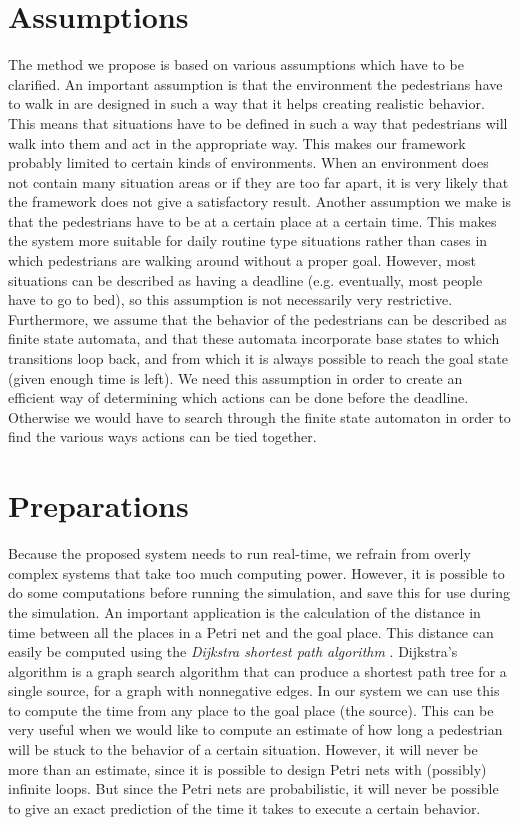 \documentclass[11pt]{book}
\begin{document}
\section{Assumptions}
The method we propose is based on various assumptions which have to be clarified. An important assumption is that the environment the pedestrians have to walk in are designed in such a way that it helps creating realistic behavior. This means that situations have to be defined in such a way that pedestrians will walk into them and act in the appropriate way. This makes our framework probably limited to certain kinds of environments. When an environment does not contain many situation areas or if they are too far apart, it is very likely that the framework does not give a satisfactory result.
Another assumption we make is that the pedestrians have to be at a certain place at a certain time. This makes the system more suitable for daily routine type situations rather than cases in which pedestrians are walking around without a proper goal. However, most situations can be described as having a deadline (e.g. eventually, most people have to go to bed), so this assumption is not necessarily very restrictive.\\
Furthermore, we assume that the behavior of the pedestrians can be described as finite state automata,  and that these automata incorporate base states to which transitions loop back, and from which it is always possible to reach the goal state (given enough time is left). We need this assumption in order to create an efficient way of determining which actions can be done before the deadline. Otherwise we would have to search through the finite state automaton in order to find the various ways actions can be tied together.\\

\section{Preparations}
Because the proposed system needs to run real-time, we refrain from overly complex systems that take too much computing power.
However, it is possible to do some computations before running the simulation, and save this for use during the simulation. An important application is the calculation of the distance in time between all the places in a Petri net and the goal place. This distance can easily be computed using the \emph{Dijkstra shortest path algorithm} \cite{dijkstra}. Dijkstra's algorithm is a graph search algorithm that can produce a shortest path tree for a single source, for a graph with nonnegative edges. In our system we can use this to compute the time from any place to the goal place (the source). This can be very useful when we would like to compute an estimate of how long a pedestrian will be stuck to the behavior of a certain situation. However, it will never be more than an estimate, since it is possible to design Petri nets with (possibly) infinite loops. But since the Petri nets are probabilistic, it will never be possible to give an exact prediction of the time it takes to execute a certain behavior.
\end{document}
